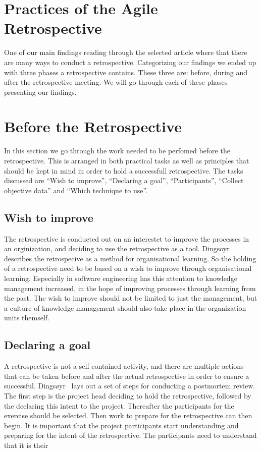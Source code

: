 \documentclass[12pt]{article}
\begin{document}
\section{Practices of the Agile Retrospective}
One of our main findings reading through the selected article where that there are many ways to conduct a retrospective. Categorizing our findings we ended up with three phases a retrospective contains. These three are: before, during and after the retrospective meeting. We will go through each of these phases presenting our findings.

\section{Before the Retrospective}
In this section we go through the work needed to be perfomed before the retrospective. This is arranged in both practical tasks as well as principles that should be kept in mind in order to hold a successfull retrospective. The tasks discussed are ``Wish to improve'', ``Declaring a goal'', ``Participants'', ``Collect objective data'' and ``Which technique to use''. 

\subsection{Wish to improve}
The retrospective is conducted out on an interestet to improve the processes in an orginization, and deciding to use the retrospective as a tool. Dingsoyr~\cite{Dingsoyr2005} describes the retrospecive as a method for organisational learning. So the holding of a retrospective need to be based on a wish to improve through organisational learning. Especially in software engineering has this attention to knowledge management increased, in the hope of improving processes through learning from the past. The wish to improve should not be limited to just the management, but a culture of knowledge management should also take place in the organization units themself.

\subsection{Declaring a goal}
A retrospective is not a self contained activity, and there are multiple actions that can be taken before and after the actual retrospective in order to ensure a successful. Dingsøyr~\cite{Dingsoyr2005} lays out a set of steps for conducting a postmortem review. The first step is the project head deciding to hold the retrospective, followed by the declaring this intent to the project. Thereafter the participants for the exercise should be selected. Then work to prepare for the retrospective can then begin. It is important that the project participants start understanding and preparing for the intent of the retrospective. The participants need to understand that it is their 
\end{document}
